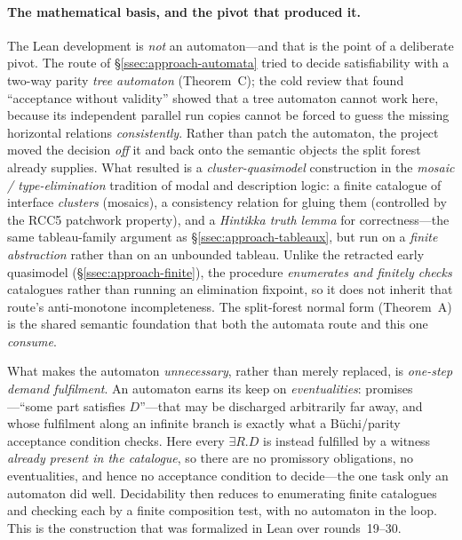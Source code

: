\documentclass[11pt]{article}
\theoremstyle{plain}
\theoremstyle{definition}
\begin{document}
\paragraph{The mathematical basis, and the pivot that produced it.} The Lean
development is \emph{not} an automaton---and that is the point of a
deliberate pivot. The route of \S\ref{ssec:approach-automata} tried to
decide satisfiability with a two-way parity \emph{tree automaton}
(Theorem~C); the cold review that found ``acceptance without validity''
showed that a tree automaton cannot work here, because its independent
parallel run copies cannot be forced to guess the missing horizontal
relations \emph{consistently}. Rather than patch the automaton, the project
moved the decision \emph{off} it and back onto the semantic objects the
split forest already supplies. What resulted is a \emph{cluster-quasimodel}
construction in the \emph{mosaic / type-elimination} tradition of modal and
description logic: a finite catalogue of interface \emph{clusters}
(mosaics), a consistency relation for gluing them (controlled by the RCC5
patchwork property), and a \emph{Hintikka truth lemma} for correctness---the
same tableau-family argument as \S\ref{ssec:approach-tableaux}, but run on a
\emph{finite abstraction} rather than on an unbounded tableau. Unlike the
retracted early quasimodel (\S\ref{ssec:approach-finite}), the procedure
\emph{enumerates and finitely checks} catalogues rather than running an
elimination fixpoint, so it does not inherit that route's anti-monotone
incompleteness. The split-forest normal form (Theorem~A) is the shared
semantic foundation that both the automata route and this one \emph{consume}.

What makes the automaton \emph{unnecessary}, rather than merely replaced, is
\emph{one-step demand fulfilment}. An automaton earns its keep on
\emph{eventualities}: promises---``some part satisfies $D$''---that may be
discharged arbitrarily far away, and whose fulfilment along an infinite
branch is exactly what a B\"uchi/parity acceptance condition checks. Here
every $\exists R.D$ is instead fulfilled by a witness \emph{already present
in the catalogue}, so there are no promissory obligations, no eventualities,
and hence no acceptance condition to decide---the one task only an automaton
did well. Decidability then reduces to enumerating finite catalogues and
checking each by a finite composition test, with no automaton in the loop.
This is the construction that was formalized in Lean over rounds~19--30.
\end{document}
